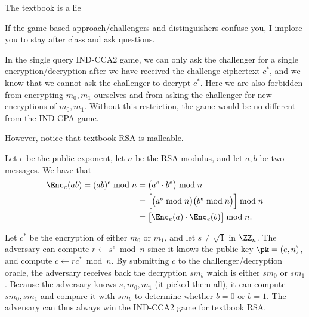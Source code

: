 \documentclass{practice}
\begin{document}
\begin{task}{The textbook is a lie}
  \begin{tcolorbox}[title=Note]
    If the game based approach/challengers and distinguishers confuse you, I implore you to stay after class and ask questions.
  \end{tcolorbox}

  In the single query IND-CCA2 game, we can only ask the challenger for a single encryption/decryption after we have received the challenge ciphertext $c^*$, and we know that we cannot ask the challenger to decrypt $c^*$.
  Here we are also forbidden from encrypting $m_0, m_1$ ourselves and from asking the challenger for new encryptions of $m_0, m_1$.
  Without this restriction, the game would be no different from the IND-CPA game.
  
  However, notice that textbook RSA is malleable.

  Let $e$ be the public exponent, let $n$ be the RSA modulus, and let $a, b$ be two messages.
  We have that
  \begin{align*}
    \Enc_e(ab) = (ab)^e\bmod{n} &= \bigl(a^e\cdot b^e\bigr)\bmod{n}\\
    &= \Bigl[\bigl(a^e\bmod{n}\bigr)\bigl(b^e \bmod{n}\bigr)\Bigr]\bmod{n}\\
    &= \bigl[\Enc_e(a) \cdot \Enc_e(b)\bigr]\bmod{n}.
  \end{align*}

  Let $c^*$ be the encryption of either $m_0$ or $m_1$, and let $s \neq \sqrt{1}$ in $\ZZ_n$.
  The adversary can compute $r \gets s^e \bmod{n}$ since it knows the public key $\pk=(e, n)$, and compute $c \gets rc^* \bmod{n}$.
  By submitting $c$ to the challenger/decryption oracle, the adversary receives back the decryption $sm_b$ which is either $sm_0$ or $sm_1$.
  Because the adversary knows $s, m_0, m_1$ (it picked them all), it can compute $sm_0, sm_1$ and compare it with $sm_b$ to determine whether $b=0$ or $b=1$.
  The adversary can thus always win the IND-CCA2 game for textbook RSA.
\end{task}
\end{document}
